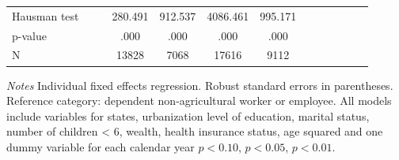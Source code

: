 \documentclass[12pt,english]{article}
\begin{document}
\begin{table}[p]
\begin{center}
\begin{adjustbox}{max width=\linewidth}
\begin{threeparttable}
{\begin{tabular}{l*{6}{S
S}}
Hausman test    &         &         &  280.491         &  912.537         & 4086.461         &  995.171         \\
\hspace*{10mm}p-value&         &         &     .000         &     .000         &     .000         &     .000         \\
N               &         &         &    13828         &     7068         &    17616         &     9112         \\
\bottomrule
\end{tabular}
\begin{tablenotes}
\item \footnotesize \textit{Notes} Individual fixed effects regression. Robust standard errors in parentheses. Reference category: dependent non-agricultural worker or employee. All models include variables for  states, urbanization level of education, marital status, number of children < 6, wealth, health insurance status, age squared and one dummy variable for each calendar year \sym{*} \(p<0.10\), \sym{**} \(p<0.05\), \sym{***} \(p<0.01\).
\end{tablenotes}
}
\end{threeparttable}
\end{adjustbox}
\end{center}
\end{table} 
\end{document}
